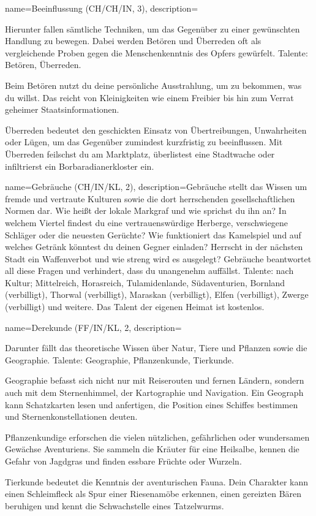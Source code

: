 {
    name={Beeinflussung (CH/CH/IN, 3)},
    description={Hierunter fallen sämtliche Techniken, um das Gegenüber zu einer gewünschten Handlung zu bewegen. Dabei werden Betören und Überreden oft als vergleichende Proben gegen die Menschenkenntnis des Opfers gewürfelt. Talente: Betören, Überreden.
\begin{description}
\item Beim Betören nutzt du deine persönliche Ausstrahlung, um zu bekommen, was du willst. Das reicht von Kleinigkeiten wie einem Freibier bis hin zum Verrat geheimer Staatsinformationen.
\item Überreden bedeutet den geschickten Einsatz von Übertreibungen, Unwahrheiten oder Lügen, um das Gegenüber zumindest kurzfristig zu beeinflussen. Mit Überreden feilschst du am Marktplatz, überlistest eine Stadtwache oder infiltrierst ein Borbaradianerkloster ein.
\end{description}}}

{
    name={Gebräuche (CH/IN/KL, 2)},
    description={Gebräuche stellt das Wissen um fremde und vertraute Kulturen sowie die dort herrschenden gesellschaftlichen Normen dar. Wie heißt der lokale Markgraf und wie sprichst du ihn an? In welchem Viertel findest du eine vertrauenswürdige Herberge, verschwiegene Schläger oder die neuesten Gerüchte? Wie funktioniert das Kamelspiel und auf welches Getränk könntest du deinen Gegner einladen? Herrscht in der nächsten Stadt ein Waffenverbot und wie streng wird es ausgelegt? Gebräuche beantwortet all diese Fragen und verhindert, dass du unangenehm auffällst. Talente: nach Kultur; Mittelreich, Horasreich, Tulamidenlande, Südaventurien, Bornland (verbilligt), Thorwal (verbilligt), Maraskan (verbilligt), Elfen (verbilligt), Zwerge (verbilligt) und weitere. Das Talent der eigenen Heimat ist kostenlos.}}

{
    name={Derekunde (FF/IN/KL, 2},
    description={Darunter fällt das theoretische Wissen über Natur, Tiere und Pflanzen sowie die Geographie. Talente: Geographie, Pflanzenkunde, Tierkunde.
\begin{description}
\item Geographie befasst sich nicht nur mit Reiserouten und fernen Ländern, sondern auch mit dem Sternenhimmel, der Kartographie und Navigation. Ein Geograph kann Schatzkarten lesen und anfertigen, die Position eines Schiffes bestimmen und Sternenkonstellationen deuten.
\item Pflanzenkundige erforschen die vielen nützlichen, gefährlichen oder wundersamen Gewächse Aventuriens. Sie sammeln die Kräuter für eine Heilsalbe, kennen die Gefahr von Jagdgras und finden essbare Früchte oder Wurzeln.
\item Tierkunde bedeutet die Kenntnis der aventurischen Fauna. Dein Charakter kann einen Schleimfleck als Spur einer Riesenamöbe erkennen, einen gereizten Bären beruhigen und kennt die Schwachstelle eines Tatzelwurms.
\end{description}}}

